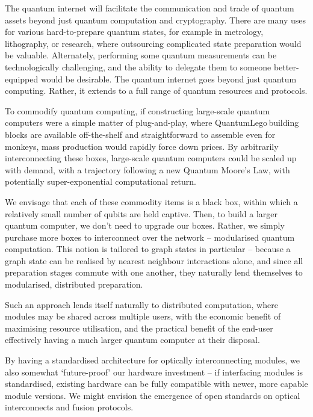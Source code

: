 The quantum internet will facilitate the communication and trade of quantum assets beyond just quantum computation and cryptography. There are many uses for various hard-to-prepare quantum states, for example in metrology, lithography, or research, where outsourcing complicated state preparation would be valuable. Alternately, performing some quantum measurements can be technologically challenging, and the ability to delegate them to someone better-equipped would be desirable. The quantum internet goes beyond just quantum computing. Rather, it extends to a full range of quantum resources and protocols.

To commodify quantum computing, if constructing large-scale quantum computers were a simple matter of plug-and-play, where QuantumLego\texttrademark\,building blocks are available off-the-shelf and straightforward to assemble even for monkeys, mass production would rapidly force down prices. By arbitrarily interconnecting these boxes, large-scale quantum computers could be scaled up with demand, with a trajectory following a new Quantum Moore's Law, with potentially super-exponential computational return.

We envisage that each of these commodity items is a black box, within which a relatively small number of qubits are held captive. Then, to build a larger quantum computer, we don't need to upgrade our boxes. Rather, we simply purchase more boxes to interconnect over the network -- modularised quantum computation. This notion is tailored to graph states in particular -- because a graph state can be realised by nearest neighbour interactions alone, and since all preparation stages commute with one another, they naturally lend themselves to modularised, distributed preparation.

Such an approach lends itself naturally to distributed computation, where modules may be shared across multiple users, with the economic benefit of maximising resource utilisation, and the practical benefit of the end-user effectively having a much larger quantum computer at their disposal.

By having a standardised architecture for optically interconnecting modules, we also somewhat `future-proof' our hardware investment -- if interfacing modules is standardised, existing hardware can be fully compatible with newer, more capable module versions. We might envision the emergence of open standards on optical interconnects and fusion protocols.

